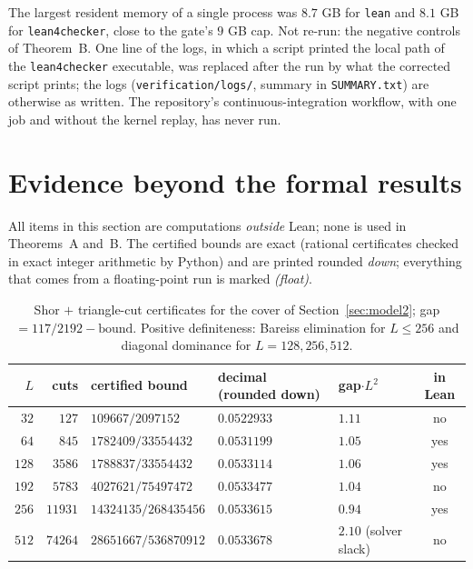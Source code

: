 \documentclass[11pt]{amsart}
\theoremstyle{remark}
\begin{document}
The largest resident memory of a single process was $8.7$ GB for \texttt{lean} and $8.1$ GB for \texttt{lean4checker}, close to the gate's $9$ GB cap. Not re-run: the negative controls of Theorem~B. One line of the logs, in which a script printed the local path of the \texttt{lean4checker} executable, was replaced after the run by what the corrected script prints; the logs (\texttt{verification/logs/}, summary in \texttt{SUMMARY.txt}) are otherwise as written. The repository's continuous-integration workflow, with one job and without the kernel replay, has never run.

\section{Evidence beyond the formal results}\label{sec:evidence}
All items in this section are computations \emph{outside} Lean; none is used in Theorems~A and~B. The certified bounds are exact (rational certificates checked in exact integer arithmetic by Python) and are printed rounded \emph{down}; everything that comes from a floating-point run is marked \emph{(float)}.

\begin{table}[h]
\centering\small
\begin{tabular}{rrlllc}
\toprule
$L$ & cuts & certified bound & decimal (rounded down) & gap$\cdot L^2$ & in Lean\\
\midrule
$32$ & $127$ & $109667/2097152$ & $0.0522933$ & $1.11$ & no\\
$64$ & $845$ & $1782409/33554432$ & $0.0531199$ & $1.05$ & yes\\
$128$ & $3586$ & $1788837/33554432$ & $0.0533114$ & $1.06$ & yes\\
$192$ & $5783$ & $4027621/75497472$ & $0.0533477$ & $1.04$ & no\\
$256$ & $11931$ & $14324135/268435456$ & $0.0533615$ & $0.94$ & yes\\
$512$ & $74264$ & $28651667/536870912$ & $0.0533678$ & $2.10$ (solver slack) & no\\
\bottomrule
\end{tabular}
\caption{Shor $+$ triangle-cut certificates for the cover of Section~\ref{sec:model2}; gap $=117/2192-\text{bound}$. Positive definiteness: Bareiss elimination for $L\le256$ and diagonal dominance for $L=128,256,512$.}\label{tab:evid}
\end{table}
\end{document}
